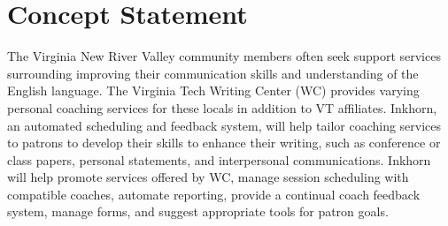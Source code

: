 \documentclass[12pt]{article} %
\begin{document}

\tableofcontents %
\newpage %


\section{Concept Statement} %



The Virginia New River Valley community members often seek support services surrounding improving their communication skills and understanding of the English language.
The Virginia Tech Writing Center (WC) provides varying personal coaching services for these locals in addition to VT affiliates.
Inkhorn, an automated scheduling and feedback system, will help tailor coaching services to patrons to develop their skills to enhance their writing, such as conference or class papers, personal statements, and interpersonal communications. 
Inkhorn will help promote services offered by WC, manage session scheduling with compatible coaches, automate reporting, provide a continual coach feedback system, manage forms, and suggest appropriate tools for patron goals.
\end{document}
